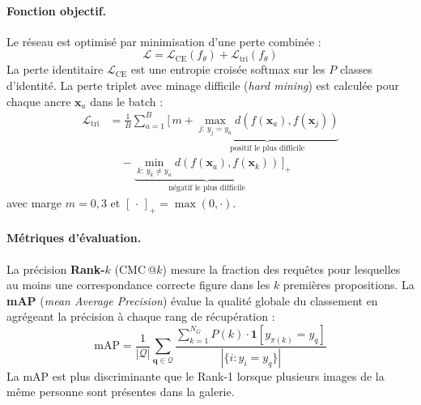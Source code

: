 \paragraph{Fonction objectif.}
Le réseau est optimisé par minimisation d'une perte combinée :
\begin{equation}
\mathcal{L} = \mathcal{L}_{\text{CE}}(f_\theta) + \mathcal{L}_{\text{tri}}(f_\theta)
\label{eq:loss_total}
\end{equation}
La perte identitaire $\mathcal{L}_{\text{CE}}$ est une entropie croisée softmax sur les $P$ classes d'identité. La perte triplet avec minage difficile (\textit{hard mining}) \cite{hermans2017defense} est calculée pour chaque ancre $\mathbf{x}_a$ dans le batch :
\begin{equation}
\begin{split}
\mathcal{L}_{\text{tri}} &= \frac{1}{B}\!\sum_{a=1}^{B}\!\bigg[\,m + \underbrace{\max_{j:\,y_j = y_a}\!d(f(\mathbf{x}_a), f(\mathbf{x}_j))}_{\text{positif le plus difficile}} \\
&\quad - \underbrace{\min_{k:\,y_k \neq y_a}\!d(f(\mathbf{x}_a), f(\mathbf{x}_k))}_{\text{négatif le plus difficile}}\,\bigg]_+
\end{split}
\label{eq:triplet}
\end{equation}
avec marge $m = 0{,}3$ et $[\,\cdot\,]_+ = \max(0, \cdot)$.

\paragraph{Métriques d'évaluation.}
La précision \textbf{Rank-$k$} (CMC\,@$k$) mesure la fraction des requêtes pour lesquelles au moins une correspondance correcte figure dans les $k$ premières propositions. La \textbf{mAP} (\textit{mean Average Precision}) évalue la qualité globale du classement en agrégeant la précision à chaque rang de récupération :
\begin{equation}
\text{mAP} = \frac{1}{|\mathcal{Q}|}\sum_{\mathbf{q} \in \mathcal{Q}} \frac{\displaystyle\sum_{k=1}^{N_G} P(k)\cdot\mathbf{1}[y_{\pi(k)} = y_q]}{|\{i : y_i = y_q\}|}
\label{eq:map}
\end{equation}
La mAP est plus discriminante que le Rank-1 lorsque plusieurs images de la même personne sont présentes dans la galerie.

